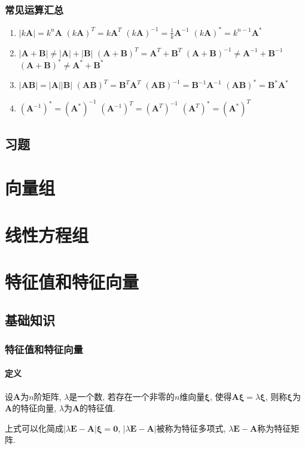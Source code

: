 \subsection{常见运算汇总}
\begin{enumerate}
	\item 
	\subitem $ |k\bm{A}|=k^{n}\bm{A} $
	\subitem $ (k\bm{A})^{T}=k\bm{A}^{T} $
	\subitem $ (k\bm{A})^{-1}=\frac{1}{k}\bm{A}^{-1} $
	\subitem $ (k\bm{A})^{*}=k^{n-1}\bm{A}^{*} $
	\item 
	\subitem $ |\bm{A}+\bm{B}|\neq |\bm{A}|+|\bm{B}| $
	\subitem $ (\bm{A}+\bm{B})^{T}=\bm{A}^{T}+\bm{B}^{T} $
	\subitem $ (\bm{A}+\bm{B})^{-1}\neq \bm{A}^{-1}+\bm{B}^{-1} $
	\subitem $ (\bm{A}+\bm{B})^{*}\neq \bm{A}^{*}+\bm{B}^{*} $
    \item 
    \subitem $ |\bm{A}\bm{B}|=|\bm{A}||\bm{B}| $
    \subitem $ (\bm{A}\bm{B})^{T}=\bm{B}^{T}\bm{A}^{T} $
    \subitem $ (\bm{A}\bm{B})^{-1}=\bm{B}^{-1}\bm{A}^{-1} $
    \subitem $ (\bm{A}\bm{B})^{*}=\bm{B}^{*}\bm{A}^{*} $
    \item 
    \subitem $ (\bm{A}^{-1})^{*}=(\bm{A}^{*})^{-1} $
    \subitem $ (\bm{A}^{-1})^{T}=(\bm{A}^{T})^{-1} $
    \subitem $ (\bm{A}^{T})^{*}=(\bm{A}^{*})^{T} $
\end{enumerate}
\section{习题}
\chapter{向量组}
\chapter{线性方程组}

\chapter{特征值和特征向量}
\section{基础知识}
\subsection{特征值和特征向量}
\subsubsection{定义}
设$ \bm{A} $为$ n $阶矩阵, $ \lambda $是一个数, 若存在一个非零的$ n $维向量$ \bm{\xi} $, 使得$ \bm{A}\bm{\xi}=\lambda \bm{\xi} $, 则称$ \bm{\xi} $为$ \bm{A} $的特征向量, $ \lambda $为$ \bm{A} $的特征值. 
\par 上式可以化简成$ \left| \lambda \bm{E}-\bm{A}\right|\bm{\xi}=\bm{0} $, $ \left| \lambda \bm{E}-\bm{A}\right| $被称为特征多项式, $ \lambda \bm{E}-\bm{A} $称为特征矩阵.
